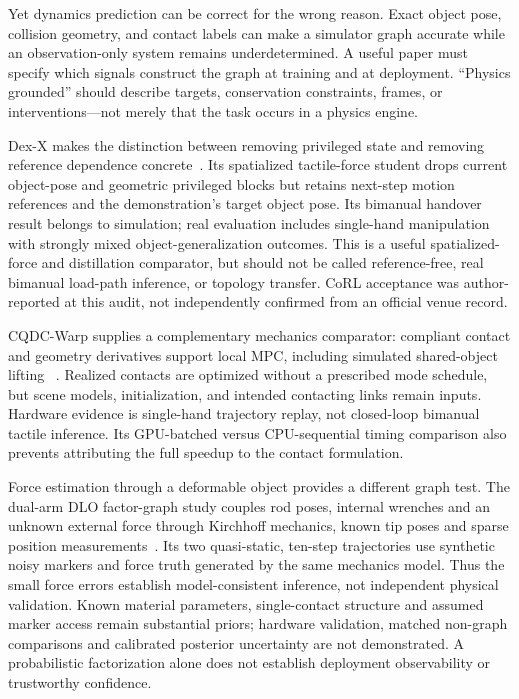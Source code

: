 Yet dynamics prediction can be correct for the wrong reason. Exact object pose,
collision geometry, and contact labels can make a simulator graph accurate while
an observation-only system remains underdetermined. A useful paper must specify
which signals construct the graph at training and at deployment. ``Physics
grounded'' should describe targets, conservation constraints, frames, or
interventions---not merely that the task occurs in a physics engine.

Dex-X makes the distinction between removing privileged state and removing
reference dependence concrete~\cite{chen2026dexx}. Its spatialized tactile-force
student drops current object-pose and geometric privileged blocks but retains
next-step motion references and the demonstration's target object pose. Its
bimanual handover result belongs to simulation; real evaluation includes
single-hand manipulation with strongly mixed object-generalization outcomes.
This is a useful spatialized-force and distillation comparator, but should not be
called reference-free, real bimanual load-path inference, or topology transfer.
CoRL acceptance was author-reported at this audit, not independently confirmed
from an official venue record.

CQDC-Warp supplies a complementary mechanics comparator: compliant contact and
geometry derivatives support local MPC, including simulated shared-object lifting
~\cite{update2026cqdcwarp}. Realized contacts are optimized without a prescribed
mode schedule, but scene models, initialization, and intended contacting links
remain inputs. Hardware evidence is single-hand trajectory replay, not closed-loop
bimanual tactile inference. Its GPU-batched versus CPU-sequential timing comparison
also prevents attributing the full speedup to the contact formulation.

Force estimation through a deformable object provides a different graph test.
The dual-arm DLO factor-graph study couples rod poses, internal wrenches and an
unknown external force through Kirchhoff mechanics, known tip poses and sparse
position measurements~\cite{update2026dloforcegraph}. Its two quasi-static,
ten-step trajectories use synthetic noisy markers and force truth generated by
the same mechanics model. Thus the small force errors establish model-consistent
inference, not independent physical validation. Known material parameters,
single-contact structure and assumed marker access remain substantial priors;
hardware validation, matched non-graph comparisons and calibrated posterior
uncertainty are not demonstrated. A probabilistic factorization alone does not
establish deployment observability or trustworthy confidence.


